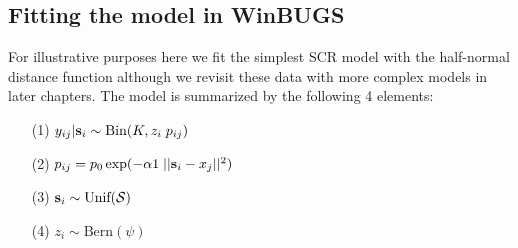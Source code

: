 \subsection{Fitting the model in WinBUGS}

For illustrative purposes here we fit the simplest SCR model with the
half-normal distance function although we revisit these data with more
complex models in later chapters. The model is summarized by the
following 4 elements:
\begin{itemize}
\item[(1)] $y_{ij}|{\bf s}_{i} \sim \mbox{Bin}(K, z_{i}\; p_{ij})$
\item[(2)] $p_{ij} = p_{0} \exp(-\alpha1 \; ||{\bf s}_{i}-x_{j}||^2)$
\item[(3)] $ {\bf s}_{i} \sim \mbox{Unif}({\cal S})$
\item[(4)] $ z_{i} \sim \mbox{Bern}(\psi)$
\end{itemize}

